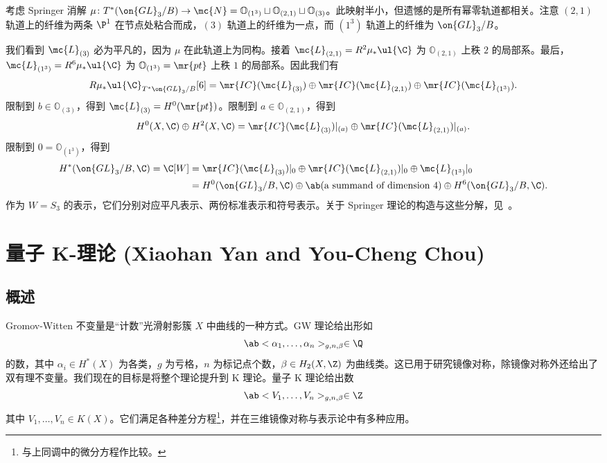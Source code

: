 \begin{exm}
    考虑 Springer 消解 \(\mu \colon T^*(\on{GL}_3/B) \to \mc{N} = \mathbb{O}_{(1^3)} \sqcup \mathbb{O}_{(2,1)} \sqcup \mathbb{O}_{(3)}\)。此映射半小，但遗憾的是所有幂零轨道都相关。注意 \((2,1)\) 轨道上的纤维为两条 \(\P^1\) 在节点处粘合而成，\((3)\) 轨道上的纤维为一点，而 \((1^3)\) 轨道上的纤维为 \(\on{GL}_3/B\)。

    我们看到 \(\mc{L}_{(3)}\) 必为平凡的，因为 \(\mu\) 在此轨道上为同构。接着 \(\mc{L}_{(2,1)} = R^2 \mu_* \ul{\C}\) 为 \(\mathbb{O}_{(2,1)}\) 上秩 \(2\) 的局部系。最后，\(\mc{L}_{(1^3)} = R^6 \mu_* \ul{\C}\) 为 \(\mathbb{O}_{(1^3)} = \mr{pt}\) 上秩 \(1\) 的局部系。因此我们有
    \[ R \mu_* \ul{\C}_{T^*\on{GL}_3/B}[6] = \mr{IC}(\mc{L}_{(3)}) \oplus \mr{IC}(\mc{L}_{(2,1)}) \oplus \mr{IC}(\mc{L}_{(1^3)}). \]
    限制到 \(b \in \mathbb{O}_{(3)}\)，得到 \(\mc{L}_{(3)} = H^0(\mr{pt})\)。限制到 \(a \in \mathbb{O}_{(2,1)}\)，得到
    \[ H^0(X, \C) \oplus H^2(X, \C) = \mr{IC}(\mc{L}_{(3)})|_{(a)} \oplus \mr{IC}(\mc{L}_{(2,1)})|_{(a)}. \]
    限制到 \(0 = \mathbb{O}_{(1^3)}\)，得到
    \begin{align*}
        H^*(\on{GL}_3/B, \C) = \C[W] &= \mr{IC}(\mc{L}_{(3)})|_0 \oplus \mr{IC}(\mc{L}_{(2,1)})|_0 \oplus \mc{L}_{(1^3)}|_0 \\
        &= H^0(\on{GL}_3/B, \C) \oplus \ab(\text{a summand of dimension } 4) \oplus H^6(\on{GL}_3/B, \C).
    \end{align*}
    作为 \(W = S_3\) 的表示，它们分别对应平凡表示、两份标准表示和符号表示。关于 Springer 理论的构造与这些分解，见~\cite{BorhoMacPherson1983}。
\end{exm}

\section{量子 K-理论 (Xiaohan Yan and You-Cheng Chou)}%
\label{sec:Quantum K-theory (Xiaohan Yan and You-Cheng Chou)}

\subsection{概述}%
\label{sub:Overview}

Gromov-Witten 不变量是“计数”光滑射影簇 \(X\) 中曲线的一种方式。GW 理论给出形如
\[ \ab<\alpha_1, \ldots, \alpha_n>_{g, n, \beta} \in \Q \]
的数，其中 \(\alpha_i \in H^*(X)\) 为各类，\(g\) 为亏格，\(n\) 为标记点个数，\(\beta \in H_2(X, \Z)\) 为曲线类。这已用于研究镜像对称，除镜像对称外还给出了双有理不变量。我们现在的目标是将整个理论提升到 K 理论。量子 K 理论给出数
\[ \ab<V_1, \ldots, V_n>_{g, n, \beta} \in \Z \]
其中 \(V_1, \ldots, V_n \in K(X)\)。它们满足各种差分方程\footnote{与上同调中的微分方程作比较。}，并在三维镜像对称与表示论中有多种应用。

